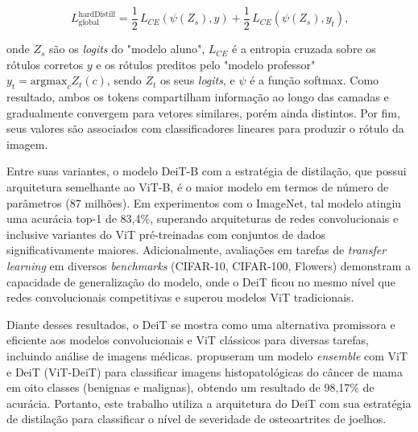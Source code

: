 \begin{equation}
    L_{\text{global}}^{\text{hardDistill}} = \frac{1}{2} \, L_{CE}\left( \psi(Z_s), y \right) + \frac{1}{2} \, L_{CE}\left( \psi(Z_s), y_t \right) \text{,}
\end{equation}

onde $Z_s$ são os \textit{logits} do "modelo aluno", $L_{CE}$ é a entropia cruzada sobre os rótulos corretos $y$ e os rótulos preditos pelo "modelo professor" $y_t = \text{argmax}_c Z_t(c)$, sendo $Z_t$ os seus \textit{logits}, e $\psi$ é a função softmax. Como resultado, ambos os tokens compartilham informação ao longo das camadas e gradualmente convergem para vetores similares, porém ainda distintos. Por fim, seus valores são associados com classificadores lineares para produzir o rótulo da imagem.

Entre suas variantes, o modelo DeiT-B com a estratégia de distilação, que possui arquitetura semelhante ao ViT-B, é o maior modelo em termos de número de parâmetros (87 milhões). Em experimentos com o ImageNet, tal modelo atingiu uma acurácia top-1 de 83,4\%, superando arquiteturas de redes convolucionais e inclusive variantes do ViT pré-treinadas com conjuntos de dados significativamente maiores. Adicionalmente, avaliações em tarefas de \textit{transfer learning} em diversos \textit{benchmarks} (CIFAR-10, CIFAR-100, Flowers) demonstram a capacidade de generalização do modelo, onde o DeiT ficou no mesmo nível que redes convolucionais competitivas e superou modelos ViT tradicionais.

Diante desses resultados, o DeiT se mostra como uma alternativa promissora e eficiente aos modelos convolucionais e ViT clássicos para diversas tarefas, incluindo análise de imagens médicas. \cite{alotaibi2022} propuseram um modelo \textit{ensemble} com ViT e DeiT (ViT-DeiT) para classificar imagens histopatológicas do câncer de mama em oito classes (benignas e malignas), obtendo um resultado de 98,17\% de acurácia. Portanto, este trabalho utiliza a arquitetura do DeiT com sua estratégia de distilação para classificar o nível de severidade de osteoartrites de joelhos.

